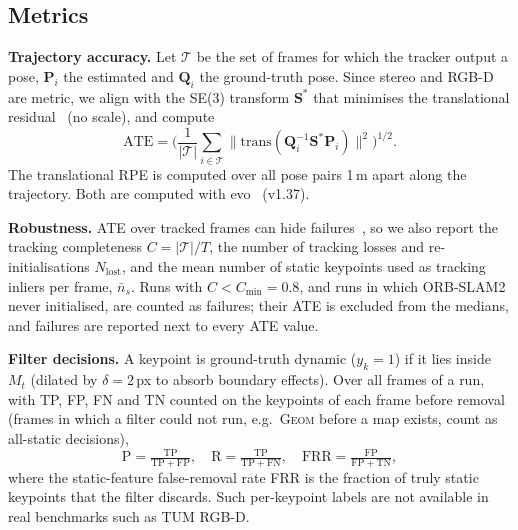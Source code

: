 \documentclass[conference]{IEEEtran}
\newcommand{\geom}{\textsc{Geom}}
\begin{document}
\subsection{Metrics}
\label{sec:metrics}
\textbf{Trajectory accuracy.} Let $\mathcal{T}$ be the set of frames for which the tracker output a pose, $\mathbf{P}_i$ the estimated and $\mathbf{Q}_i$ the ground-truth pose. Since stereo and RGB-D are metric, we align with the SE(3) transform $\mathbf{S}^\ast$ that minimises the translational residual~\cite{umeyama1991} (no scale), and compute
\begin{equation}
\mathrm{ATE}=\Big(\frac{1}{|\mathcal{T}|}\sum_{i\in\mathcal{T}}\big\|\mathrm{trans}(\mathbf{Q}_i^{-1}\mathbf{S}^\ast\mathbf{P}_i)\big\|^2\Big)^{1/2}.
\end{equation}
The translational RPE is computed over all pose pairs 1\,m apart along the trajectory. Both are computed with evo~\cite{grupp2017evo} (v1.37).

\textbf{Robustness.} ATE over tracked frames can hide failures~\cite{bonetto2023simulation}, so we also report the tracking completeness $C=|\mathcal{T}|/T$, the number of tracking losses and re-initialisations $N_{\mathrm{lost}}$, and the mean number of static keypoints used as tracking inliers per frame, $\bar{n}_s$. Runs with $C<C_{\min}=0.8$, and runs in which ORB-SLAM2 never initialised, are counted as failures; their ATE is excluded from the medians, and failures are reported next to every ATE value.

\textbf{Filter decisions.} A keypoint is ground-truth dynamic ($y_k=1$) if it lies inside $M_t$ (dilated by $\delta=2$\,px to absorb boundary effects). Over all frames of a run, with TP, FP, FN and TN counted on the keypoints of each frame before removal (frames in which a filter could not run, e.g.\ \geom{} before a map exists, count as all-static decisions),
\begin{equation}
\mathrm{P}=\tfrac{\mathrm{TP}}{\mathrm{TP}+\mathrm{FP}},\quad
\mathrm{R}=\tfrac{\mathrm{TP}}{\mathrm{TP}+\mathrm{FN}},\quad
\mathrm{FRR}=\tfrac{\mathrm{FP}}{\mathrm{FP}+\mathrm{TN}},
\end{equation}
where the static-feature false-removal rate FRR is the fraction of truly static keypoints that the filter discards. Such per-keypoint labels are not available in real benchmarks such as TUM RGB-D.
\end{document}

